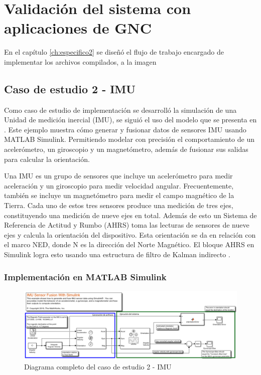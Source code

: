 \chapter{Validación del sistema con aplicaciones de GNC}
\label{ch:especifico3}

En el capítulo \ref{ch:especifico2} se diseñó el flujo de trabajo encargado de implementar los archivos compilados, a la imagen 

\section{Caso de estudio 2 - IMU}

Como caso de estudio de implementación se desarrolló la simulación de una Unidad de medición inercial (IMU), se siguió el uso del modelo que se presenta en \cite{mathworks2024imu}. Este ejemplo muestra cómo generar y fusionar datos de sensores IMU usando MATLAB Simulink. Permitiendo modelar con precisión el comportamiento de un acelerómetro, un giroscopio y un magnetómetro, además de  fusionar sus salidas para calcular la orientación.

Una IMU es un grupo de sensores que incluye un acelerómetro para medir aceleración y un giroscopio para medir velocidad angular. Frecuentemente, también se incluye un magnetómetro para medir el campo magnético de la Tierra. Cada uno de estos tres sensores produce una medición de tres ejes, constituyendo una medición de nueve ejes en total. Además de esto un Sistema de Referencia de Actitud y Rumbo (AHRS) toma las lecturas de sensores de nueve ejes y calcula la orientación del dispositivo. Esta orientación se da en relación con el marco NED, donde N es la dirección del Norte Magnético. El bloque AHRS en Simulink logra esto usando una estructura de filtro de Kalman indirecto \cite{mathworks2024imu}.

\newpage
\subsection{Implementación en MATLAB Simulink}

\begin{figure}[h!]
    \centering
    \includegraphics[width=1.0\textwidth]{fig/Capitulo5/Caso_de_estudio_IMU/FULL_IMU.pdf}
    \caption{Diagrama completo del caso de estudio 2 - IMU \cite{mathworks2024imu}}
    \label{fig:caso_de_estudio_2_IMU}
\end{figure}


